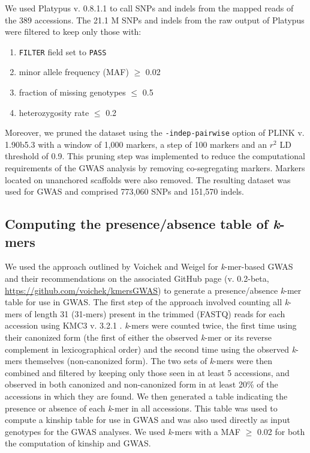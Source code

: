 \documentclass{article}
\begin{document}
We used Platypus v. 0.8.1.1 \citep{rimmer2014} to call SNPs and indels from the
mapped reads of the 389 accessions. The 21.1 M SNPs and
indels from the raw output of Platypus were filtered to keep only those with:

\begin{enumerate}
	\item \texttt{FILTER} field set to \texttt{PASS}
	\item minor allele frequency (MAF) $\geq$ 0.02
	\item fraction of missing genotypes $\leq$ 0.5
	\item heterozygosity rate $\leq$ 0.2
\end{enumerate}

Moreover, we pruned the dataset using the \texttt{-\-indep-pairwise} option of
PLINK v. 1.90b5.3 \citep{purcell2007} with a window of 1,000 markers, a
step of 100 markers and an $r^2$ LD threshold of 0.9. This pruning step was
implemented to reduce the computational requirements of the GWAS analysis by
removing co-segregating markers. Markers located on unanchored scaffolds were
also removed. The resulting dataset was used for GWAS and comprised 773,060
SNPs and 151,570 indels.

\subsection*{Computing the presence/absence table of \emph{k}-mers}

We used the approach outlined by Voichek and Weigel \cite{voichek2020} for \emph{k}-mer-based GWAS
and their recommendations on the
associated GitHub page (v. 0.2-beta, \url{https://github.com/voichek/kmersGWAS}) to generate
a presence/absence \emph{k}-mer table for use in GWAS.  The first step of
the approach involved counting all \emph{k}-mers of length 31 (31-mers) present
in the trimmed (FASTQ) reads for each accession using KMC3 v. 3.2.1
\citep{kokot2017}. \emph{k}-mers were counted twice, the first time using their
canonized form (the first of either the observed \textit{k}-mer or its reverse
complement in lexicographical order) and the second time using the observed
\emph{k}-mers themselves (non-canonized form). The two sets of \textit{k}-mers
were then combined and filtered by
keeping only those seen in at least 5 accessions, and observed in both canonized
and non-canonized form in at least 20\% of the accessions in which they are found.
We then generated a table indicating the presence or absence of each
\emph{k}-mer in all accessions. This table was used to compute a kinship
table for use in GWAS and was also used directly as input genotypes for the
GWAS analyses. We used \emph{k}-mers with a MAF $\geq$ 0.02 for both the
computation of kinship and GWAS.
\end{document}
